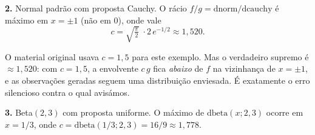\documentclass[
  portuguese,
  11pt,
  openany]{book}
\newenvironment{Shaded}{\begin{snugshade}}{\end{snugshade}}
\newcommand{\AttributeTok}[1]{\textcolor[rgb]{0.13,0.29,0.53}{#1}}
\newcommand{\ConstantTok}[1]{\textcolor[rgb]{0.56,0.35,0.01}{#1}}
\newcommand{\ControlFlowTok}[1]{\textcolor[rgb]{0.13,0.29,0.53}{\textbf{#1}}}
\newcommand{\DecValTok}[1]{\textcolor[rgb]{0.00,0.00,0.81}{#1}}
\newcommand{\FunctionTok}[1]{\textcolor[rgb]{0.13,0.29,0.53}{\textbf{#1}}}
\newcommand{\NormalTok}[1]{#1}
\newcommand{\OtherTok}[1]{\textcolor[rgb]{0.56,0.35,0.01}{#1}}
\newcommand{\SpecialCharTok}[1]{\textcolor[rgb]{0.81,0.36,0.00}{\textbf{#1}}}
\newcommand{\StringTok}[1]{\textcolor[rgb]{0.31,0.60,0.02}{#1}}
\begin{document}
\textbf{2.} Normal padrão com proposta Cauchy. O rácio \(f/g = \text{dnorm}/\text{dcauchy}\)
é máximo em \(x = \pm 1\) (não em \(0\)), onde vale
\[c = \sqrt{\tfrac{\pi}{2}}\;\cdot 2\,e^{-1/2} \approx 1{,}520.\]

\begin{Shaded}
\end{Shaded}

O material original usava \(c = 1{,}5\) para este exemplo. Mas o verdadeiro
supremo é \(\approx 1{,}520\): com \(c = 1{,}5\), a envolvente \(c\,g\) fica \emph{abaixo}
de \(f\) na vizinhança de \(x = \pm 1\), e as observações geradas seguem uma
distribuição enviesada. É exatamente o erro silencioso contra o qual avisámos.

\textbf{3.} Beta\((2,3)\) com proposta uniforme. O máximo de \(\text{dbeta}(x;2,3)\)
ocorre em \(x = 1/3\), onde \(c = \text{dbeta}(1/3;2,3) = 16/9 \approx 1{,}778\).
\end{document}
